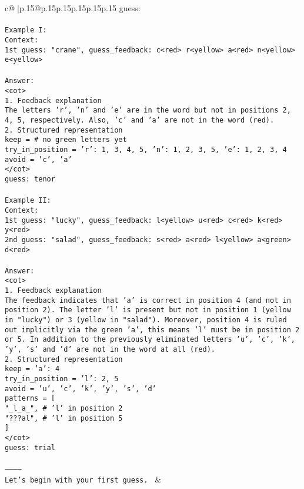 \documentclass{article}
\begin{document}
{\begin{supertabular}{c@{$\;$}|p{.15\linewidth}@{}p{.15\linewidth}p{.15\linewidth}p{.15\linewidth}p{.15\linewidth}p{.15\linewidth}}
{{{guess:\\ \tt \\ \tt Example I:\\ \tt Context:\\ \tt 1st guess: "crane", guess_feedback: c<red> r<yellow> a<red> n<yellow> e<yellow>\\ \tt \\ \tt Answer:\\ \tt <cot>\\ \tt 1. Feedback explanation\\ \tt The letters 'r', 'n' and 'e' are in the word but not in positions 2, 4, 5, respectively. Also, 'c' and 'a' are not in the word (red).\\ \tt 2. Structured representation\\ \tt keep = {}  # no green letters yet\\ \tt try_in_position = {'r': {1, 3, 4, 5}, 'n': {1, 2, 3, 5}, 'e': {1, 2, 3, 4}}\\ \tt avoid = {'c', 'a'}\\ \tt </cot>\\ \tt guess: tenor\\ \tt \\ \tt Example II:\\ \tt Context:\\ \tt 1st guess: "lucky", guess_feedback: l<yellow> u<red> c<red> k<red> y<red>\\ \tt 2nd guess: "salad", guess_feedback: s<red> a<red> l<yellow> a<green> d<red>\\ \tt \\ \tt Answer:\\ \tt <cot>\\ \tt 1. Feedback explanation\\ \tt The feedback indicates that 'a' is correct in position 4 (and not in position 2). The letter 'l' is present but not in position 1 (yellow in "lucky") or 3 (yellow in "salad"). Moreover, position 4 is ruled out implicitly via the green 'a', this means 'l' must be in position 2 or 5. In addition to the previously eliminated letters {'u', 'c', 'k', 'y'}, 's' and 'd' are not in the word at all (red).\\ \tt 2. Structured representation\\ \tt keep = {'a': 4}\\ \tt try_in_position = {'l': {2, 5}}\\ \tt avoid = {'u', 'c', 'k', 'y', 's', 'd'}\\ \tt patterns = [\\ \tt     "_l_a_",  # 'l' in position 2\\ \tt     "???al",  # 'l' in position 5\\ \tt ]\\ \tt </cot>\\ \tt guess: trial\\ \tt \\ \tt -----------\\ \tt Let's begin with your first guess. 
	  } 
	   } 
	   } 
	 & \\ 
 


\end{supertabular}}
\end{document}
